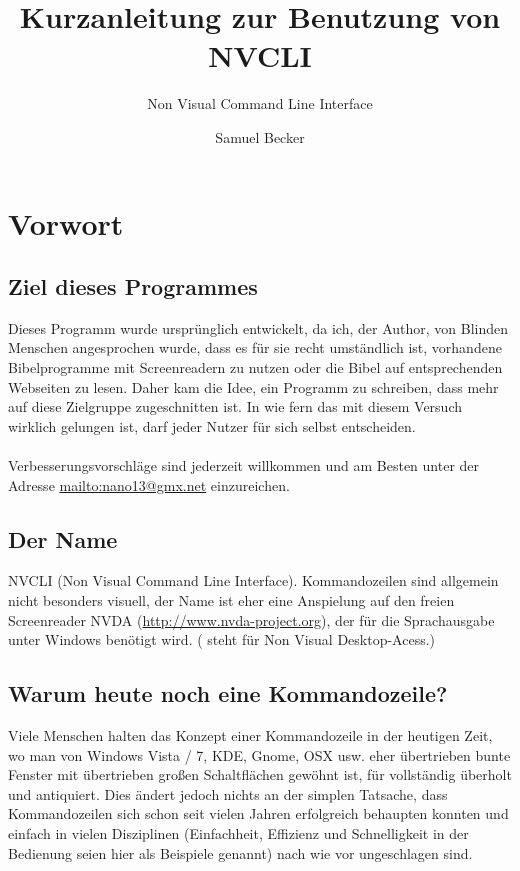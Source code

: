\documentclass[a4paper]{scrartcl}
\begin{document}
\title{Kurzanleitung zur Benutzung von NVCLI}
\subtitle{Non Visual Command Line Interface}
\author{Samuel Becker}
\maketitle

\tableofcontents


\setcounter{section}{-1}
\section{Vorwort}

\subsection{Ziel dieses Programmes}
Dieses Programm wurde ursprünglich entwickelt, da ich, der Author, von Blinden Menschen angesprochen wurde, dass es für sie recht umständlich ist, vorhandene Bibelprogramme mit Screenreadern zu nutzen oder die Bibel auf entsprechenden Webseiten zu lesen. Daher kam die Idee, ein Programm zu schreiben, dass mehr auf diese Zielgruppe zugeschnitten ist. In wie fern das mit diesem Versuch wirklich gelungen ist, darf jeder Nutzer für sich selbst entscheiden.\\
\\
Verbesserungsvorschläge sind jederzeit willkommen und am Besten unter der Adresse \url{mailto:nano13@gmx.net} einzureichen.

\subsection{Der Name}
NVCLI (Non Visual Command Line Interface). Kommandozeilen sind allgemein nicht besonders visuell, der Name ist eher eine Anspielung auf den freien Screenreader NVDA (\url{http://www.nvda-project.org}), der für die Sprachausgabe unter Windows benötigt wird. ( steht für Non Visual Desktop-Acess.)

\subsection{Warum heute noch eine Kommandozeile?}
Viele Menschen halten das Konzept einer Kommandozeile in der heutigen Zeit, wo man von Windows Vista / 7, KDE, Gnome, OSX usw. eher übertrieben bunte Fenster mit übertrieben großen Schaltflächen gewöhnt ist, für vollständig überholt und antiquiert. Dies ändert jedoch nichts an der simplen Tatsache, dass Kommandozeilen sich schon seit vielen Jahren erfolgreich behaupten konnten und einfach in vielen Disziplinen (Einfachheit, Effizienz und Schnelligkeit in der Bedienung seien hier als Beispiele genannt) nach wie vor ungeschlagen sind.
\end{document}
